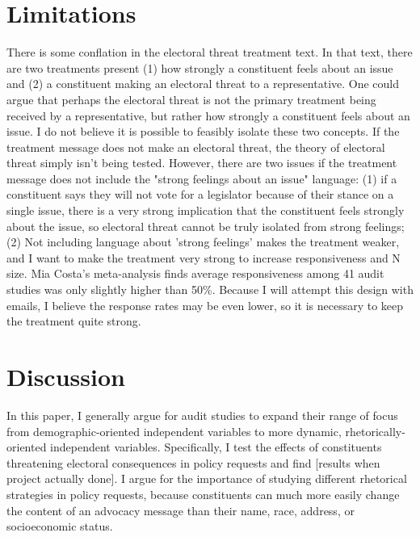 \documentclass[12pt]{article}
\begin{document}
 

\section{Limitations}
There is some conflation in the electoral threat treatment text. In that text, there are two treatments present (1) how strongly a constituent feels about an issue and (2) a constituent making an electoral threat to a representative. One could argue that perhaps the electoral threat is not the primary treatment being received by a representative, but rather how strongly a constituent feels about an issue. I do not believe it is possible to feasibly isolate these two concepts. If the treatment message does not make an electoral threat, the theory of electoral threat simply isn't being tested. However, there are two issues if the treatment message does not include the "strong feelings about an issue" language: (1) if a constituent says they will not vote for a legislator because of their stance on a single issue, there is a very strong implication that the constituent feels strongly about the issue, so electoral threat cannot be truly isolated from strong feelings; (2) Not including language about 'strong feelings' makes the treatment weaker, and I want to make the treatment very strong to increase responsiveness and N size. Mia Costa's meta-analysis finds average responsiveness among 41 audit studies was only slightly higher than 50\%. Because I will attempt this design with emails, I believe the response rates may be even lower, so it is necessary to keep the treatment quite strong.

\section{Discussion}
In this paper, I generally argue for audit studies to expand their range of focus from demographic-oriented independent variables to more dynamic, rhetorically-oriented independent variables. Specifically, I test the effects of constituents threatening electoral consequences in policy requests and find [results when project actually done]. I argue for the importance of studying different rhetorical strategies in policy requests, because constituents can much more easily change the content of an advocacy message than their name, race, address, or socioeconomic status. 




\end{document}
